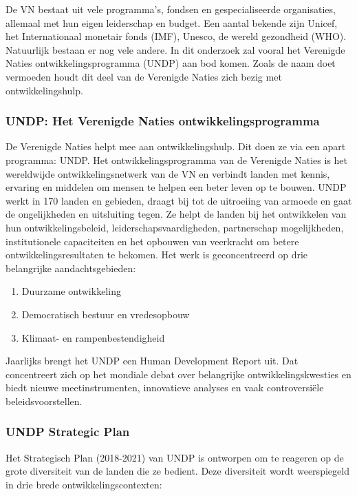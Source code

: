 De VN bestaat uit vele programma's, fondsen en gespecialiseerde organisaties, allemaal met hun eigen leiderschap en budget. Een aantal bekende zijn Unicef, het Internationaal monetair fonds (IMF), Unesco, de wereld gezondheid (WHO). Natuurlijk bestaan er nog vele andere. In dit onderzoek zal vooral het Verenigde Naties ontwikkelingsprogramma (UNDP) aan bod komen. Zoals de naam doet vermoeden houdt dit deel van de Verenigde Naties zich bezig met ontwikkelingshulp.

\subsubsection{UNDP: Het Verenigde Naties ontwikkelingsprogramma}
De Verenigde Naties helpt mee aan ontwikkelingshulp. Dit doen ze via een apart programma: UNDP. Het ontwikkelingsprogramma van de Verenigde Naties is het wereldwijde ontwikkelingsnetwerk van de VN en verbindt landen met kennis, ervaring en middelen om mensen te helpen een beter leven op te bouwen. UNDP werkt in 170 landen en gebieden, draagt bij tot de uitroeiing van armoede en gaat de ongelijkheden en uitsluiting tegen. Ze helpt de landen bij het ontwikkelen van hun ontwikkelingsbeleid, leiderschapsvaardigheden, partnerschap mogelijkheden, institutionele capaciteiten en het opbouwen van veerkracht om betere ontwikkelingsresultaten te bekomen. \autocite{DevelopmentProgram2020}
Het werk is geconcentreerd op drie belangrijke aandachtsgebieden:

\begin{enumerate}
\item Duurzame ontwikkeling
\item Democratisch bestuur en vredesopbouw
\item Klimaat- en rampenbestendigheid
\end{enumerate}

 Jaarlijks brengt het UNDP een Human Development Report uit. Dat concentreert zich op het mondiale debat over belangrijke ontwikkelingskwesties en biedt nieuwe meetinstrumenten, innovatieve analyses en vaak controversiële beleidsvoorstellen. \autocite{DevelopmentProgram2020} 

\subsubsection{UNDP Strategic Plan}
Het Strategisch Plan (2018-2021) van UNDP is ontworpen om te reageren op de grote diversiteit van de landen die ze bedient. Deze diversiteit wordt weerspiegeld in drie brede ontwikkelingscontexten: \autocite{DevelopmentProgram2020}


